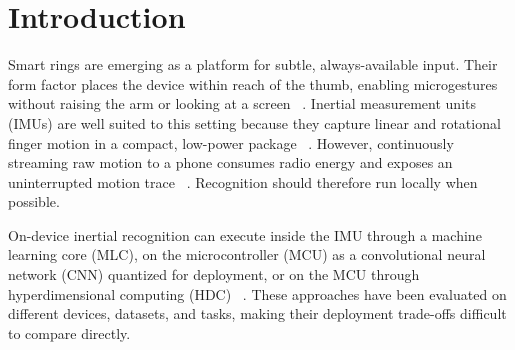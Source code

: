 \begin{abstract}
On-device ring microgesture recognition can execute inside an inertial sensor
or on a microcontroller, but these placements have rarely been compared under
the same task and hardware constraints. We implement an in-sensor machine
learning core (MLC), a microcontroller convolutional neural network (CNN), and
a microcontroller hyperdimensional classifier (HDC) on one custom ring. Using
longitudinal session data, four-participant cross-user evaluation, held-out
free-living wear, and hardware measurements, we compare recognition and system
cost. CNN achieves the highest within-user macro-F1 (0.978), whereas MLC gives
the strongest cross-user transfer (0.791) and the lowest measured system power
(6.64\,mW versus 14.03\,mW for HDC and 20.58\,mW for CNN). MLC also produces
the fewest free-living false activations. Raw-sample HDC trails in accuracy,
but a statistical-feature ablation raises its within-user macro-F1 from 0.691
to 0.904. These results show that classifier placement and representation
jointly determine the accuracy, robustness, and resource trade-off.
\end{abstract}

\section{Introduction}

Smart rings are emerging as a platform for subtle, always-available input.
Their form factor places the device within reach of the thumb, enabling
microgestures without raising the arm or looking at a screen
~\cite{oura-galaxy-ring,ring-input-survey,microgesture-elicitation}.
Inertial measurement units (IMUs) are well suited to this setting because they
capture linear and rotational finger motion in a compact, low-power package
~\cite{imu-gesture-recognition}. However, continuously streaming raw motion to
a phone consumes radio energy and exposes an uninterrupted motion trace
~\cite{streaming-ring-system}. Recognition should therefore run locally when
possible.

On-device inertial recognition can execute inside the IMU through a machine
learning core (MLC), on the microcontroller (MCU) as a convolutional neural
network (CNN) quantized for deployment, or on the MCU through hyperdimensional
computing (HDC)
~\cite{st-mlc,tflm,kanerva-hdc,hypercam}. These approaches have been evaluated
on different devices, datasets, and tasks, making their deployment trade-offs
difficult to compare directly.

